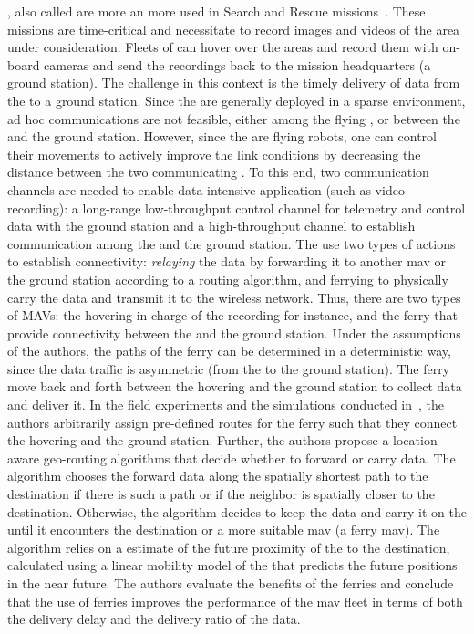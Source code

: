 , also called  are more an more used in Search and Rescue missions~\cite{asadpour2016route,asadpour2013now,asadpour2014micro}. These missions are time-critical and necessitate to record images and videos of the area under consideration. Fleets of  can hover over the areas and record them with on-board cameras and send the recordings back to the mission headquarters (a ground station). The challenge in this context is the timely delivery of data from the  to a ground station. Since the  are generally deployed in a sparse environment, ad hoc communications are not feasible, either among the flying , or between the  and the ground station. However, since the  are flying robots, one can control their movements to actively improve the link conditions by decreasing the distance between the two communicating . To this end, two communication channels are needed to enable data-intensive application (such as video recording): a long-range low-throughput control channel for telemetry and control data with the ground station and a high-throughput channel to establish communication among the  and the ground station. The  use two types of actions to establish connectivity: \textit{relaying} the data by forwarding it to another \Acrshort{mav} or the ground station according to a routing algorithm, and ferrying to physically carry the data and transmit it to the wireless network. Thus, there are two types of MAVs: the hovering  in charge of the recording for instance, and the ferry  that provide connectivity between the  and the ground station. Under the assumptions of the authors, the paths of the ferry  can be determined in a deterministic way, since the data traffic is asymmetric (from the  to the ground station). The ferry  move back and forth between the hovering  and the ground station to collect data and deliver it. In the field experiments and the simulations conducted in~\cite{asadpour2016route}, the authors arbitrarily assign pre-defined routes for the ferry  such that they connect the hovering  and the ground station. Further, the authors propose a location-aware geo-routing algorithms that decide whether to forward or carry data. The algorithm chooses the forward data along the spatially shortest path to the destination if there is such a path or if the neighbor is spatially closer to the destination. Otherwise, the algorithm decides to keep the data and carry it on the  until it encounters the destination or a more suitable \Acrshort{mav} (\eg a ferry \Acrshort{mav}). The algorithm relies on a estimate of the future proximity of the  to the destination, calculated using a linear mobility model of the  that predicts the future positions in the near future. The authors evaluate the benefits of the ferries and conclude that the use of ferries improves the performance of the \Acrshort{mav} fleet in terms of both the delivery delay and the delivery ratio of the data.

